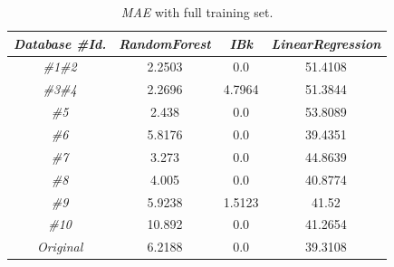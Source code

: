 \documentclass[journal,twoside,web]{ieeecolor}
\begin{document}
\begin{table}[h]
	\begin{center}
			\footnotesize{\begin{tabular}{cccc}\hline
			\textit{\textbf{Database \#Id.}} & \textit{\textbf{RandomForest}} & \textit{\textbf{IBk}} & \textit{\textbf{LinearRegression
				}} \\\hline
				
				\textit{\#1\#2} & 2.2503 & 0.0 & 51.4108\\
				\textit{\#3\#4} & 2.2696 & 4.7964 & 51.3844 \\	
				\textit{\#5} & 2.438 & 0.0 & 53.8089\\
				\textit{\#6} & 5.8176 & 0.0 & 39.4351 \\
				\textit{\#7} & 3.273 & 0.0 & 44.8639 \\
				\textit{\#8} & 4.005 & 0.0 & 40.8774\\
				\textit{\#9} & 5.9238 & 1.5123 & 41.52\\
				\textit{\#10} & 10.892 & 0.0 & 41.2654\\
				\textit{Original} & 6.2188 & 0.0  & 39.3108\\
				\hline		
			\end{tabular}}
		\end{center}
		\caption{\textit{MAE} with full training set.}
		\label{MFTS}
	\end{table}
	
\end{document}
